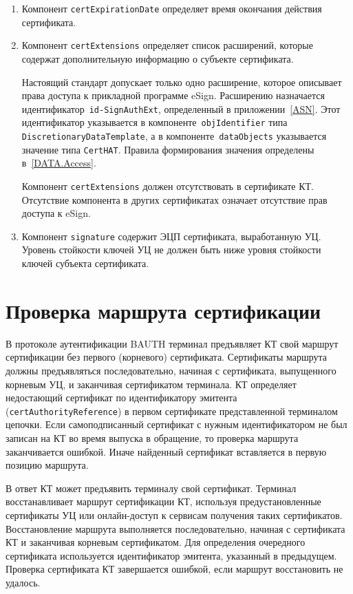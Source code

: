 \begin{enumerate}
\item
Компонент \verb|certExpirationDate| определяет время окончания действия 
сертификата.

\item
Компонент \verb|certExtensions| определяет список расширений, 
которые содержат дополнительную информацию о субъекте сертификата. 

Настоящий стандарт допускает только одно расширение, которое описывает 
права доступа к прикладной программе eSign. 
Расширению назначается идентификатор~\verb|id-SignAuthExt|,
определенный в приложении~\ref{ASN}. Этот идентификатор указывается
в компоненте~\texttt{objIdentifier} типа \texttt{DiscretionaryDataTemplate},
а в компоненте~\texttt{dataObjects} указывается значение типа \verb|CertHAT|.
Правила формирования значения определены в~\ref{DATA.Access}. 

Компонент \verb|certExtensions| должен отсутствовать в сертификате КТ.
%
Отсутствие компонента в других сертификатах означает отсутствие прав доступа к 
eSign. 

\item
Компонент \verb|signature| содержит ЭЦП сертификата, выработанную УЦ.
Уровень стойкости ключей УЦ не должен быть ниже уровня стойкости 
ключей субъекта сертификата.
\end{enumerate}

\section{Проверка маршрута сертификации}\label{CERTS.Path}

В протоколе аутентификации BAUTH терминал предъявляет КТ свой маршрут сертификации 
без первого (корневого) сертификата. 
%
Сертификаты маршрута должны предъявляться последовательно, начиная с сертификата,
выпущенного корневым УЦ, и заканчивая сертификатом терминала.
%
КТ определяет недостающий сертификат по идентификатору эмитента 
(\texttt{certAuthorityReference}) в первом сертификате представленной 
терминалом цепочки. 
%
Если самоподписанный сертификат с нужным идентификатором не был записан 
на КТ во время выпуска в обращение, то проверка маршрута заканчивается
ошибкой. Иначе найденный сертификат вставляется в первую позицию маршрута.

В ответ КТ может предъявить терминалу свой сертификат.
%
Терминал восстанавливает маршрут сертификации КТ, используя предустановленные 
сертификаты УЦ или онлайн-доступ к сервисам получения таких сертификатов.
%
Восстановление маршрута выполняется последовательно, начиная с сертификата КТ и
заканчивая корневым сертификатом. Для определения очередного сертификата
используется идентификатор эмитента, указанный в предыдущем. Проверка
сертификата КТ завершается ошибкой, если маршрут восстановить не удалось.

